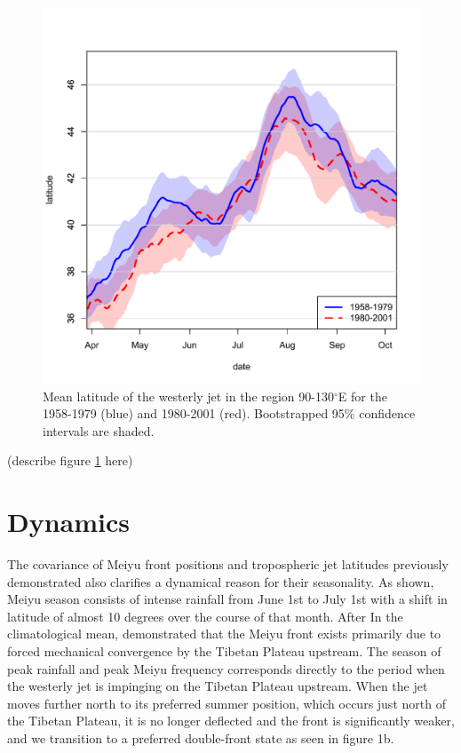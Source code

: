 \documentclass[draft,grl]{AGUTeX}
\begin{document}
\begin{article}
\begin{figure}[htbp]
\begin{center}
\includegraphics[width=5in]{Figures/jet_seasonal.pdf}
\caption{Mean latitude of the westerly jet in the region 90-130$^\circ$E for the 1958-1979 (blue) and 1980-2001 (red). Bootstrapped 95\% confidence intervals are shaded. }
\label{jet_seasonal}
\end{center}
\end{figure}

(describe figure \ref{jet_seasonal} here) 

\section{Dynamics}

	The covariance of Meiyu front positions and tropospheric jet latitudes previously demonstrated also clarifies a dynamical reason for their seasonality. As shown, Meiyu season consists of intense rainfall from June 1st to July 1st with a shift in latitude of almost 10 degrees over the course of that month. After  In the climatological mean, \cite{Chen2014} demonstrated that the Meiyu front exists primarily due to forced mechanical convergence by the Tibetan Plateau upstream. The season of peak rainfall and peak Meiyu frequency corresponds directly to the period when the westerly jet is impinging on the Tibetan Plateau upstream. When the jet moves further north to its preferred summer position, which occurs just north of the Tibetan Plateau, it is no longer deflected and the front is significantly weaker, and we transition to a preferred double-front state as seen in figure 1b. 


\end{article}
\end{document}
